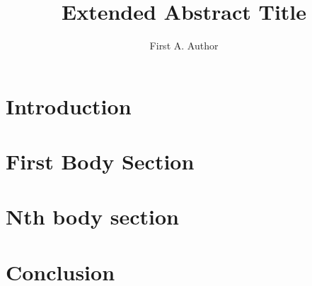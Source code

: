 \documentclass[eabstract]{sac}
\title{Extended Abstract Title}
\author{First A. Author}
\affil{Institution, Address}
\begin{document}
\maketitle

\section{Introduction}

\section{First Body Section}

\section{Nth body section}

\section{Conclusion}

\pagebreak

\end{document}
